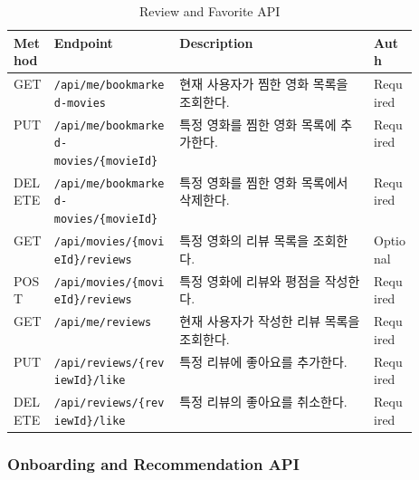 \documentclass[11pt,a4paper]{article}
\renewcommand{\arraystretch}{1.18}
\begin{document}
\begin{table}[H]
\centering
\footnotesize
\setlength{\tabcolsep}{5pt}
\renewcommand{\arraystretch}{1.28}
\begin{tabularx}{\linewidth}{@{}>{\RaggedRight\arraybackslash}p{0.10\linewidth}>{\RaggedRight\arraybackslash}p{0.31\linewidth}>{\RaggedRight\arraybackslash}X>{\RaggedRight\arraybackslash}p{0.11\linewidth}@{}}
\toprule
\textbf{Method} & \textbf{Endpoint} & \textbf{Description} & \textbf{Auth} \\
\midrule
GET & \texttt{/\allowbreak{}api/\allowbreak{}me/\allowbreak{}bookmarked-\allowbreak{}movies} & 현재 사용자가 찜한 영화 목록을 조회한다. & Required \\
PUT & \texttt{/\allowbreak{}api/\allowbreak{}me/\allowbreak{}bookmarked-\allowbreak{}movies/\allowbreak{}\{\allowbreak{}movieId\}\allowbreak{}} & 특정 영화를 찜한 영화 목록에 추가한다. & Required \\
DELETE & \texttt{/\allowbreak{}api/\allowbreak{}me/\allowbreak{}bookmarked-\allowbreak{}movies/\allowbreak{}\{\allowbreak{}movieId\}\allowbreak{}} & 특정 영화를 찜한 영화 목록에서 삭제한다. & Required \\
GET & \texttt{/\allowbreak{}api/\allowbreak{}movies/\allowbreak{}\{\allowbreak{}movieId\}\allowbreak{}/\allowbreak{}reviews} & 특정 영화의 리뷰 목록을 조회한다. & Optional \\
POST & \texttt{/\allowbreak{}api/\allowbreak{}movies/\allowbreak{}\{\allowbreak{}movieId\}\allowbreak{}/\allowbreak{}reviews} & 특정 영화에 리뷰와 평점을 작성한다. & Required \\
GET & \texttt{/\allowbreak{}api/\allowbreak{}me/\allowbreak{}reviews} & 현재 사용자가 작성한 리뷰 목록을 조회한다. & Required \\
PUT & \texttt{/\allowbreak{}api/\allowbreak{}reviews/\allowbreak{}\{\allowbreak{}reviewId\}\allowbreak{}/\allowbreak{}like} & 특정 리뷰에 좋아요를 추가한다. & Required \\
DELETE & \texttt{/\allowbreak{}api/\allowbreak{}reviews/\allowbreak{}\{\allowbreak{}reviewId\}\allowbreak{}/\allowbreak{}like} & 특정 리뷰의 좋아요를 취소한다. & Required \\
\bottomrule
\end{tabularx}
\caption{Review and Favorite API}
\end{table}

\hypertarget{onboarding-and-recommendation-api}{%
\subsubsection{Onboarding and Recommendation API}\label{onboarding-and-recommendation-api}}
\end{document}
